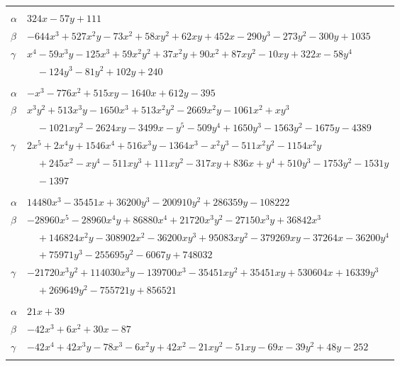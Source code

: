 \documentclass[11pt]{article}
\begin{document}
\begin{longtable}{@{}ll@{}}
\addlinespace[3pt]
\multicolumn{2}{@{}l}{$\{i,j\}=\{70,220\}$, $k_{ij}=2^{3}\cdot 3\cdot 7$}\\
$\alpha$ & $324x-57y+111$\\
$\beta$ & $-644x^{3}+527x^{2}y-73x^{2}+58xy^{2}+62xy+452x-290y^{3}-273y^{2}-300y+1035$\\
$\gamma$ & $x^{4}-59x^{3}y-125x^{3}+59x^{2}y^{2}+37x^{2}y+90x^{2}+87xy^{2}-10xy+322x-58y^{4}$\\
 & $\quad -124y^{3}-81y^{2}+102y+240$\\
\addlinespace[3pt]
\multicolumn{2}{@{}l}{$\{i,j\}=\{71,72\}$, $k_{ij}=2\cdot 3^{5}\cdot 7$}\\
$\alpha$ & $-x^{3}-776x^{2}+515xy-1640x+612y-395$\\
$\beta$ & $x^{3}y^{2}+513x^{3}y-1650x^{3}+513x^{2}y^{2}-2669x^{2}y-1061x^{2}+xy^{3}$\\
 & $\quad -1021xy^{2}-2624xy-3499x-y^{5}-509y^{4}+1650y^{3}-1563y^{2}-1675y-4389$\\
$\gamma$ & $2x^{5}+2x^{4}y+1546x^{4}+516x^{3}y-1364x^{3}-x^{2}y^{3}-511x^{2}y^{2}-1154x^{2}y$\\
 & $\quad +245x^{2}-xy^{4}-511xy^{3}+111xy^{2}-317xy+836x+y^{4}+510y^{3}-1753y^{2}-1531y$\\
 & $\quad -1397$\\
\addlinespace[3pt]
\multicolumn{2}{@{}l}{$\{i,j\}=\{72,94\}$, $k_{ij}=2^{2}\cdot 3^{4}\cdot 7^{2}\cdot 13$}\\
$\alpha$ & $14480x^{3}-35451x+36200y^{3}-200910y^{2}+286359y-108222$\\
$\beta$ & $-28960x^{5}-28960x^{4}y+86880x^{4}+21720x^{3}y^{2}-27150x^{3}y+36842x^{3}$\\
 & $\quad +146824x^{2}y-308902x^{2}-36200xy^{3}+95083xy^{2}-379269xy-37264x-36200y^{4}$\\
 & $\quad +75971y^{3}-255695y^{2}-6067y+748032$\\
$\gamma$ & $-21720x^{3}y^{2}+114030x^{3}y-139700x^{3}-35451xy^{2}+35451xy+530604x+16339y^{3}$\\
 & $\quad +269649y^{2}-755721y+856521$\\
\addlinespace[3pt]
\multicolumn{2}{@{}l}{$\{i,j\}=\{72,102\}$, $k_{ij}=2^{2}\cdot 3^{3}$}\\
$\alpha$ & $21x+39$\\
$\beta$ & $-42x^{3}+6x^{2}+30x-87$\\
$\gamma$ & $-42x^{4}+42x^{3}y-78x^{3}-6x^{2}y+42x^{2}-21xy^{2}-51xy-69x-39y^{2}+48y-252$\\
\addlinespace[3pt]
\multicolumn{2}{@{}l}{$\{i,j\}=\{72,160\}$, $k_{ij}=2^{3}\cdot 3^{2}\cdot 7$}\\

\end{longtable}
\end{document}
